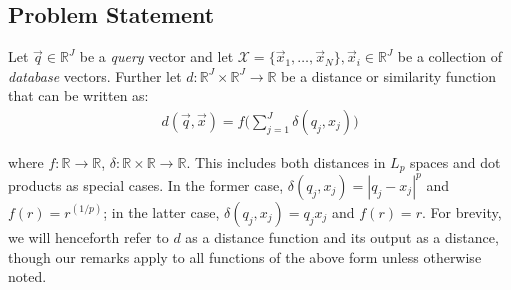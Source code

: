 





\subsection{Problem Statement}


Let $\vec{q} \in \mathbb{R}^J$ be a \textit{query} vector and let $\mathcal{X} = \{\vec{x}_1,\ldots,\vec{x}_N\}, \vec{x}_i \in \mathbb{R}^J$ be a collection of \textit{database} vectors. Further let $d: \mathbb{R}^J \times \mathbb{R}^J \rightarrow \mathbb{R}$ be a distance or similarity function that can be written as:
\begin{align} \label{eq:distFuncForm}
        d(\vec{q}, \vec{x}) = f \big( \sum_{j=1}^J \delta(q_j, x_j) \big)
\end{align}


where $f: \mathbb{R} \rightarrow \mathbb{R}$, $\delta: \mathbb{R} \times \mathbb{R} \rightarrow \mathbb{R}$. This includes both distances in $L_p$ spaces and dot products as special cases. In the former case, $\delta(q_j, x_j) = |q_j - x_j|^p$ and $f(r) = r^{(1/p)}$; in the latter case, $\delta(q_j, x_j) = q_j x_j$ and $f(r) = r$. For brevity, we will henceforth refer to $d$ as a distance function and its output as a distance, though our remarks apply to all functions of the above form unless otherwise noted.

